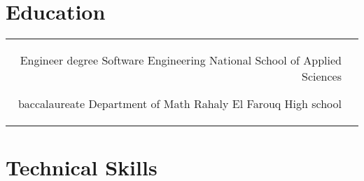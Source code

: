 \documentclass[10pt]{article} %
\begin{document}
\begin{paracol}{2}

\section{Education} 





\begin{supertabular}{rl} %

	
	
	{Engineer degree} %
	{} %
	{Software Engineering} %
	{National School of Applied Sciences} %
	
	
	{baccalaureate} %
	{} %
	{Department of Math} %
	{Rahaly El Farouq High school} %
	

\end{supertabular}



\section{Technical Skills} 



\end{paracol}
\end{document}
